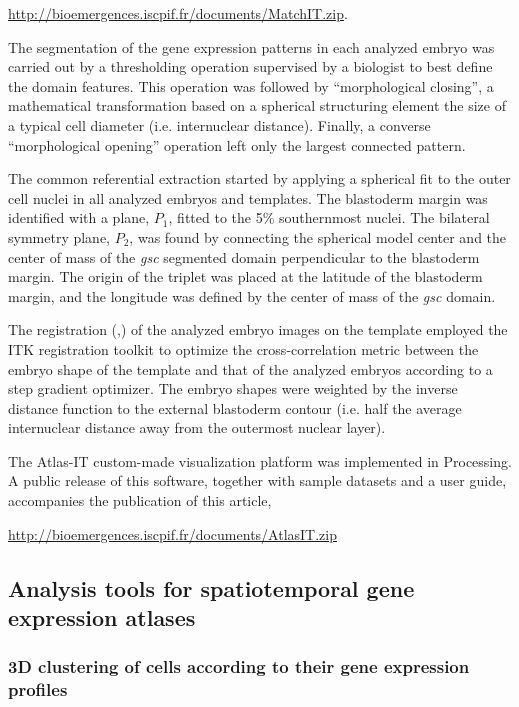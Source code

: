 \url{http://bioemergences.iscpif.fr/documents/MatchIT.zip}.

The segmentation of the gene expression patterns in each analyzed embryo was carried out by a thresholding operation supervised by a biologist to best define the domain features. This operation was followed by ``morphological closing''\cite{serra8288}, a mathematical transformation based on a spherical structuring element the size of a typical cell diameter (i.e. internuclear distance). Finally, a converse ``morphological opening'' operation left only the largest connected pattern.

The common referential extraction started by applying a spherical fit to the outer cell nuclei in all analyzed embryos and templates. The blastoderm margin was identified with a plane, $P_1$, fitted to the 5\% southernmost nuclei. The bilateral symmetry plane, $P_2$, was found by connecting the spherical model center and the center of mass of the \emph{gsc} segmented domain perpendicular to the blastoderm margin. The origin of the triplet was placed at the latitude of the blastoderm margin, and the longitude was defined by the center of mass of the \emph{gsc} domain.

The registration (\cite{zitova2003image},\cite{maintz1998survey}) of the analyzed embryo images on the template employed the ITK registration toolkit to optimize the cross-correlation metric between the embryo shape of the template and that of the analyzed embryos according to a step gradient optimizer. The embryo shapes were weighted by the inverse distance function to the external blastoderm contour (i.e. half the average internuclear distance away from the outermost nuclear layer).



The Atlas-IT custom-made visualization platform was implemented in Processing. A public release of this software, together with sample datasets and a user guide, accompanies the publication of this article,

\url{http://bioemergences.iscpif.fr/documents/AtlasIT.zip}



\subsection*{Analysis tools for spatiotemporal gene expression atlases}

\label{subsec:AnalyticalTools}



\subsubsection*{\textbf{3D clustering of cells according to their gene expression profiles}}



